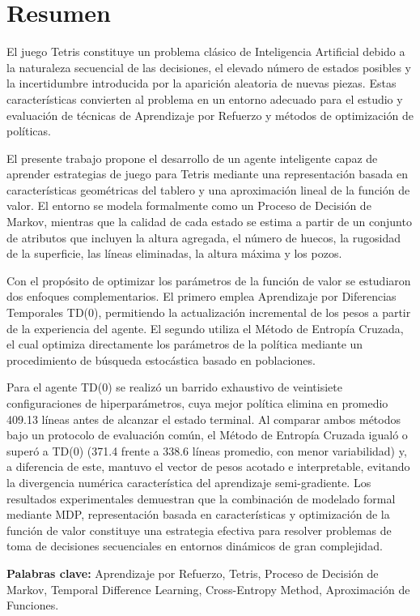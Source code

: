 \section*{Resumen}

El juego Tetris constituye un problema clásico de Inteligencia Artificial debido a la naturaleza secuencial de las decisiones, el elevado número de estados posibles y la incertidumbre introducida por la aparición aleatoria de nuevas piezas. Estas características convierten al problema en un entorno adecuado para el estudio y evaluación de técnicas de Aprendizaje por Refuerzo y métodos de optimización de políticas.

El presente trabajo propone el desarrollo de un agente inteligente capaz de aprender estrategias de juego para Tetris mediante una representación basada en características geométricas del tablero y una aproximación lineal de la función de valor. El entorno se modela formalmente como un Proceso de Decisión de Markov, mientras que la calidad de cada estado se estima a partir de un conjunto de atributos que incluyen la altura agregada, el número de huecos, la rugosidad de la superficie, las líneas eliminadas, la altura máxima y los pozos.

Con el propósito de optimizar los parámetros de la función de valor se estudiaron dos enfoques complementarios. El primero emplea Aprendizaje por Diferencias Temporales TD(0), permitiendo la actualización incremental de los pesos a partir de la experiencia del agente. El segundo utiliza el Método de Entropía Cruzada, el cual optimiza directamente los parámetros de la política mediante un procedimiento de búsqueda estocástica basado en poblaciones.

Para el agente TD(0) se realizó un barrido exhaustivo de veintisiete configuraciones de hiperparámetros, cuya mejor política elimina en promedio 409.13 líneas antes de alcanzar el estado terminal. Al comparar ambos métodos bajo un protocolo de evaluación común, el Método de Entropía Cruzada igualó o superó a TD(0) (371.4 frente a 338.6 líneas promedio, con menor variabilidad) y, a diferencia de este, mantuvo el vector de pesos acotado e interpretable, evitando la divergencia numérica característica del aprendizaje semi-gradiente. Los resultados experimentales demuestran que la combinación de modelado formal mediante MDP, representación basada en características y optimización de la función de valor constituye una estrategia efectiva para resolver problemas de toma de decisiones secuenciales en entornos dinámicos de gran complejidad.

\textbf{Palabras clave:} Aprendizaje por Refuerzo, Tetris, Proceso de Decisión de Markov, Temporal Difference Learning, Cross-Entropy Method, Aproximación de Funciones.
